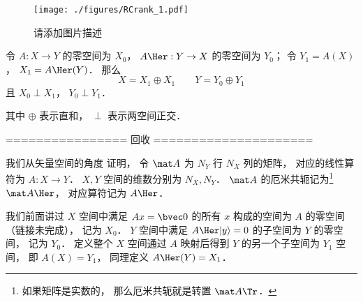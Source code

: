 
\begin{issues}
\issueDraft
\end{issues}


\begin{figure}[ht]
\centering
\texttt{[image: ./figures/RCrank\_1.pdf]}
\caption{请添加图片描述} \label{RCrank_fig1}
\end{figure}

\begin{theorem}{}
令 $A:X \to Y$ 的零空间为 $X_0$， $A\Her: Y \to X$ 的零空间为 $Y_0$； 令 $Y_1 = A(X)$， $X_1 = A\Her(Y)$． 那么
\begin{equation}
X = X_1 \oplus X_1 \qquad Y = Y_0 \oplus Y_1
\end{equation}
且 $X_0 \perp X_1$， $Y_0 \perp Y_1$．
\end{theorem}
其中 $\oplus$ 表示直和， $\perp$ 表示两空间正交．


================ 回收 =====================

我们从矢量空间的角度 证明， 令 $\mat A$ 为 $N_Y$ 行 $N_X$ 列的矩阵， 对应的线性算符为 $A: X\to Y$． $X, Y$ 空间的维数分别为 $N_X, N_Y$． $\mat A$ 的厄米共轭记为\footnote{如果矩阵是实数的， 那么厄米共轭就是转置 $\mat A\Tr$．} $\mat A\Her$， 对应算符记为 $A\Her$．

我们前面讲过 $X$ 空间中满足 $A {x} = \bvec 0$ 的所有 ${x}$ 构成的空间为 $A$ 的零空间（链接未完成）， 记为 $X_0$． $Y$ 空间中满足 $A\Her |y\rangle = 0$ 的子空间为 $Y$ 的零空间， 记为 $Y_0$． 定义整个 $X$ 空间通过 $A$ 映射后得到 $Y$ 的另一个子空间为 $Y_1$ 空间， 即 $A(X) = Y_1$， 同理定义 $A\Her(Y) = X_1$． %


